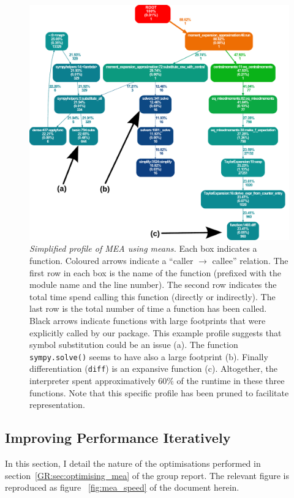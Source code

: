 \begin{figure}[tbh]
\begin{centering}
\includegraphics[width=0.83\textwidth{}]{profile.pdf}
\caption{\emph{Simplified profile of MEA using means.}
 Each box indicates a function.
 Coloured arrows indicate a ``caller $ \rightarrow $ callee'' relation.
 The first row in each box is the name of the function (prefixed with the module name and the line number).
 The second row indicates the total time spend calling this function (directly or indirectly).
 The last row is the total number of time a function has been called.
 Black arrows indicate \sympy{} functions with large footprints that were explicitly called by our package.
 This example profile suggests that symbol substitution could be an issue (a).
 The function \texttt{sympy.solve()} seems to have also a large footprint (b).
 Finally differentiation (\texttt{diff}) is an expansive function (c).
 Altogether, the interpreter spent approximatively $60\%$
 of the runtime in these three functions.
 Note that this specific profile has been pruned to facilitate representation.
}
\label{fig:profiled}
\end{centering}
\end{figure}


\subsection{Improving Performance Iteratively}
In this section, I detail the nature of the optimisations performed in section~\ref*{GR:sec:optimising_mea} of the group report.
The relevant figure is reproduced as figure ~\ref{fig:mea_speed} of the document herein.

